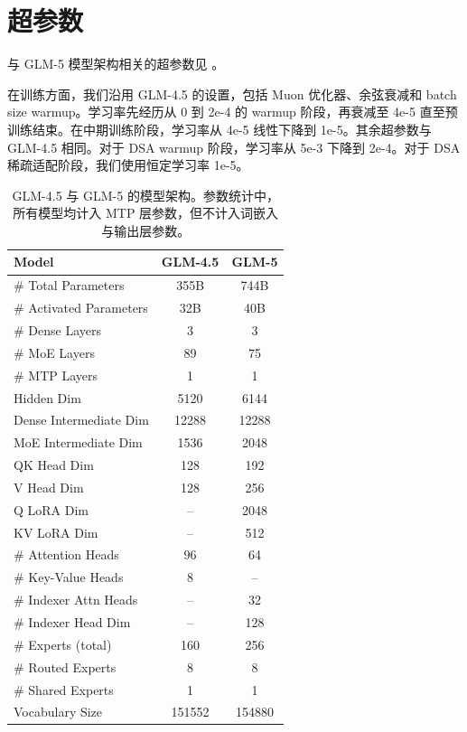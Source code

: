 \appendix

\section{超参数}

与 GLM-5 模型架构相关的超参数见 。

在训练方面，我们沿用 GLM-4.5 的设置，包括 Muon 优化器、余弦衰减和 batch size warmup。学习率先经历从 0 到 2e-4 的 warmup 阶段，再衰减至 4e-5 直至预训练结束。在中期训练阶段，学习率从 4e-5 线性下降到 1e-5。其余超参数与 GLM-4.5 相同。对于 DSA warmup 阶段，学习率从 5e-3 下降到 2e-4。对于 DSA 稀疏适配阶段，我们使用恒定学习率 1e-5。

\begin{table}[!ht]
    \centering
    \caption{GLM-4.5 与 GLM-5 的模型架构。参数统计中，所有模型均计入 MTP 层参数，但不计入词嵌入与输出层参数。}
    \label{tab:model_arch_glm45_glm5}
    \begin{tabular}{l|cc}
    \toprule
       Model & \textbf{GLM-4.5} & \textbf{GLM-5} \\
    \midrule
       \# Total Parameters & 355B & 744B \\
       \# Activated Parameters & 32B & 40B \\
       \# Dense Layers & 3 & 3 \\
       \# MoE Layers & 89 & 75 \\
       \# MTP Layers & 1 & 1 \\
       Hidden Dim & 5120 & 6144 \\
       Dense Intermediate Dim & 12288 & 12288 \\
       MoE Intermediate Dim & 1536 & 2048 \\
    \midrule
       QK Head Dim & 128 & 192 \\
       V Head Dim & 128 & 256 \\
       Q LoRA Dim & -- & 2048 \\
       KV LoRA Dim & -- & 512 \\
       \# Attention Heads & 96 & 64 \\
       \# Key-Value Heads & 8 & -- \\
       \# Indexer Attn Heads & -- & 32 \\
       \# Indexer Head Dim & -- & 128 \\
    \midrule
       \# Experts (total) & 160 & 256 \\
       \# Routed Experts & 8 & 8 \\
       \# Shared Experts & 1 & 1 \\
    \midrule
       Vocabulary Size & 151552 & 154880 \\
    \bottomrule
    \end{tabular}
\end{table}

